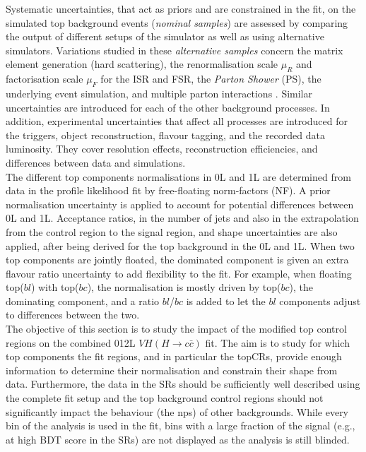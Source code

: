 

Systematic uncertainties, that act as priors and are constrained in the fit, on the simulated top background events (\textit{nominal samples}) are assessed by comparing the output of different setups of the simulator as well as using alternative simulators. Variations studied in these \textit{alternative samples} concern the matrix element generation (hard scattering), the renormalisation scale $\mu_R$ and factorisation scale $\mu_F$ for the ISR and FSR, the \textit{Parton Shower} (PS), the underlying event simulation, and multiple parton interactions \cite{Mironova:2837159}. Similar uncertainties are introduced for each of the other background processes. In addition, experimental uncertainties that affect all processes are introduced for the triggers, object reconstruction, flavour tagging, and the recorded data luminosity. They cover resolution effects, reconstruction efficiencies, and differences between data and simulations.\\

The different top components normalisations in 0L and 1L are determined from data in the profile likelihood fit by free-floating norm-factors (NF). A prior normalisation uncertainty is applied to account for potential differences between 0L and 1L. Acceptance ratios, in the number of jets and also in the extrapolation from the control region to the signal region, and shape uncertainties are also applied, after being derived for the top background in the 0L and 1L. When two top components are jointly floated, the dominated component is given an extra flavour ratio uncertainty to add flexibility to the fit. For example, when floating top($bl$) with top($bc$), the normalisation is mostly driven by top($bc$), the dominating component, and a ratio $bl$/$bc$ is added to let the $bl$ components adjust to differences between the two.  \\

The objective of this section is to study the impact of the modified top control regions on the combined 012L $VH(H\rightarrow c\bar{c})$ fit. The aim is to study for which top components the fit regions, and in particular the topCRs, provide enough information to determine their normalisation and constrain their shape from data. Furthermore, the data in the SRs should be sufficiently well described using the complete fit setup and the top background control regions should not significantly impact the behaviour (the \gls{np}s) of other backgrounds. While every bin of the analysis is used in the fit, bins with a large fraction of the signal (e.g., at high BDT score in the SRs) are not displayed as the analysis is still blinded. \\

